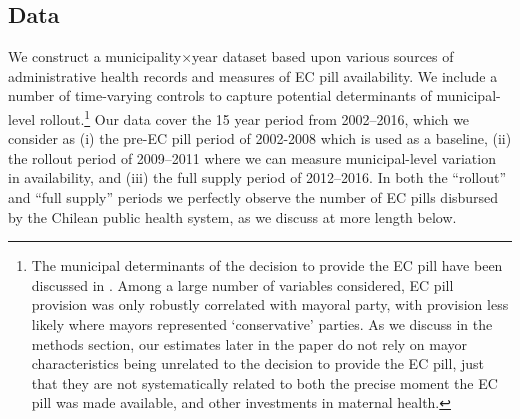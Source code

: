 \documentclass[12pt]{article}
\begin{document}
\begin{spacing}{1.9}
\subsection{Data}
\label{scn:data}
We construct a municipality$\times$year dataset based upon various sources of
administrative health records and measures of EC pill availability.  We include a number of time-varying controls to capture potential determinants of municipal-level rollout.\footnote{The municipal determinants of the decision to provide the EC pill have been discussed in \citet{BentancorClarke2017}.  Among a large number of variables considered, EC pill provision was only robustly correlated with mayoral party, with provision less likely where mayors represented `conservative' parties.  As we discuss in the methods section, our estimates later in the paper do not rely on mayor characteristics being unrelated to the decision to provide the EC pill, just that they are not systematically related to both the precise moment the EC pill was made available, and other investments in maternal health.}
Our data cover the 15 year period from 2002--2016, which we consider as (i) the pre-EC pill period of 2002-2008 which is used as a baseline, (ii) the rollout period of 2009--2011 where we can measure municipal-level variation in availability, and (iii) the full supply period of 2012--2016.  In both the ``rollout'' and ``full supply'' periods we perfectly observe the number of EC pills disbursed by the Chilean public health system, as we discuss at more length below.


\end{spacing}
\end{document}
